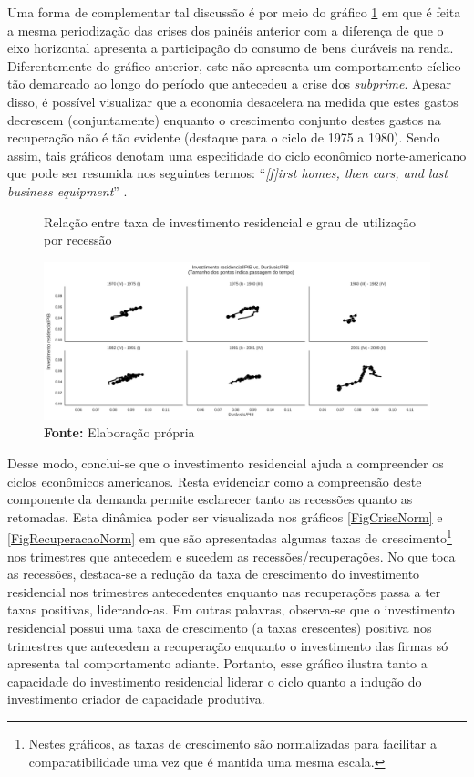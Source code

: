 
Uma forma de complementar tal discussão é por meio do gráfico \ref{FigInvesto_Duraveis} em que é feita a mesma periodização das crises dos painéis anterior com a diferença de que o eixo horizontal apresenta a participação do consumo de bens duráveis na renda. Diferentemente do gráfico anterior, este não apresenta um comportamento cíclico tão demarcado ao longo do período que antecedeu a crise dos \textit{subprime}. Apesar disso, é possível visualizar que a economia desacelera na medida que estes gastos decrescem (conjuntamente) enquanto o crescimento conjunto destes gastos na recuperação não é tão evidente (destaque para o ciclo de 1975 a 1980).
Sendo assim, tais gráficos denotam uma especifidade do ciclo econômico norte-americano que pode ser resumida nos seguintes termos: ``\textit{[f]irst homes, then cars, and last business equipment}'' \cite[p.~8]{leamer_housing_2007}.

\begin{figure}[H]
	\centering
	\caption{Relação entre taxa de investimento residencial e grau de utilização por recessão}
	\label{FigInvesto_Duraveis}
	\includegraphics[width=\textwidth]{../../Dados/Fatos_Estilizados/figs/Ciclo_Ih_Duraveis.png}
	\caption*{\textbf{Fonte:} Elaboração própria}
\end{figure}

Desse modo, conclui-se que o investimento residencial ajuda a compreender os ciclos econômicos americanos.
Resta evidenciar como a compreensão deste componente da demanda permite esclarecer tanto as recessões quanto as retomadas. Esta dinâmica poder ser visualizada nos gráficos \ref{FigCriseNorm} e \ref{FigRecuperacaoNorm} em que são apresentadas algumas taxas de crescimento\footnote{Nestes gráficos, as taxas de crescimento são normalizadas para facilitar a comparatibilidade uma vez que é mantida uma mesma escala.} nos trimestres que antecedem e sucedem as recessões/recuperações. 
No que toca as recessões, destaca-se a redução da taxa de crescimento do investimento residencial nos trimestres antecedentes enquanto nas recuperações passa a ter taxas positivas, liderando-as.
Em outras palavras, observa-se que o investimento residencial possui uma taxa de crescimento (a taxas crescentes) positiva nos trimestres que antecedem a recuperação enquanto o investimento das firmas só apresenta tal comportamento adiante. Portanto, esse gráfico ilustra tanto a capacidade do investimento residencial liderar o ciclo quanto a indução do investimento criador de capacidade produtiva.


